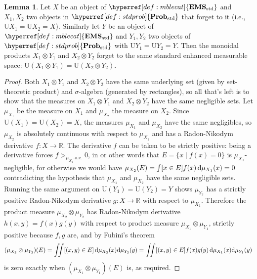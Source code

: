 \documentclass[
  sigconf,
  screen, ]{acmart}
\theoremstyle{definition}
\newtheorem{lemma}[theorem]{Lemma}
\newcommand\R{\mathbb R}
\newcommand\nref[2]{\hyperref[#1]{#2}} \newcommand\checkhigh{{\huge{\color{red}\textbf{TODO: check}}}}
\newcommand\texforgetmu{\mathrm{U}}
\newcommand\forgetmu{{\nref{def:forgetmu}{\texforgetmu}}}
\newcommand\texStdProb{\mathbf{Prob}_{\rm std}}
\newcommand\StdProb{{\nref{def:stdprob}{\texStdProb}}}
\newcommand\texStdMble{\mathbf{EMS}_{\rm std}}
\newcommand\StdMble{{\nref{def:mblecat}{\texStdMble}}}
\begin{document}
\begin{lemma} \label{app:lem:stdprob-prod-forgets-uniquely}
  Let $X$ be an object of $\StdMble$
  and $X_1,X_2$ two objects in $\StdProb$
  that forget to it (i.e., $\forgetmu X_1 = \forgetmu X_2 = X$).
  Similarly let $Y$ be an object of $\StdMble$ and $Y_1,Y_2$
  two objects of $\StdProb$ with $\forgetmu Y_1 = \forgetmu Y_2 = Y$.
  Then the monoidal products $X_1\otimes Y_1$
  and $X_2\otimes Y_2$ forget to the same
  standard enhanced measurable space: $\forgetmu (X_1\otimes Y_1) = \forgetmu (X_2\otimes Y_2)$.
\end{lemma}
\begin{proof}
  Both $X_1\otimes Y_1$ and $X_2\otimes Y_2$
  have the same underlying set (given by set-theoretic product)
  and $\sigma$-algebra (generated by rectangles),
  so all that's left is to show
  that the measures on $X_1\otimes Y_1$ and $X_2\otimes Y_2$
  have the same negligible sets.
  Let $\mu_{X_1}$ be the measure on $X_1$
  and $\mu_{X_2}$ the measure on $X_2$.
  Since $\forgetmu (X_1) = \forgetmu (X_2) = X$,
  the measures $\mu_{X_1}$ and $\mu_{X_2}$
  have the same negligibles,
  so $\mu_{X_2}$ is absolutely continuous
  with respect to $\mu_{X_1}$
  and has a Radon-Nikodym derivative
  $f : X\to \R$.
  The derivative $f$ can be taken to be strictly positive:
  being a derivative forces
   $f >_{\text{$\mu_{X_1}$-a.e.}} 0$, in or other words that
  $E = \{x \mid f(x) = 0\}$ is $\mu_{X_1}$-negligible,
  for otherwise we would have
  $\mu_{X_2}(E) = \int [x\in E] f(x) \,{\rm d}\mu_{X_1}(x) = 0$
  contradicting the hypothesis that
  $\mu_{X_1}$ and $\mu_{X_2}$ have the same negligible sets.
  Running the same argument on $\forgetmu (Y_1) = \forgetmu (Y_2) = Y$
  shows $\mu_{Y_2}$ has a strictly positive Radon-Nikodym derivative
  $g : X\to \R$ with respect to $\mu_{X_1}$.
  Therefore the product measure $\mu_{X_2}\otimes \mu_{Y_2}$
  has Radon-Nikodym derivative $h(x,y) = f(x)g(y)$
  with respect to product measure $\mu_{X_1}\otimes \mu_{Y_1}$,
  strictly positive because $f,g$ are, and by Fubini's theorem
  \[
    (\mu_{X_2}\otimes \mu_{Y_2})(E)
    = \iint [(x,y)\in E]\,{\rm d}\mu_{X_2}(x){\rm d}\mu_{Y_2}(y)
    = \iint [(x,y)\in E]f(x)g(y)\,{\rm d}\mu_{X_1}(x){\rm d}\mu_{Y_1}(y)
  \]
  is zero exactly when $(\mu_{X_1}\otimes\mu_{Y_1})(E)$ is, as required.
\end{proof}
\end{document}
